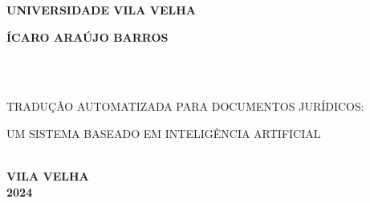 \thispagestyle{empty}

\vfill
 \begin{center}
    

    {\large\bfseries UNIVERSIDADE VILA VELHA} \\
    
   

    \vspace*{1in}
    \begin{large} \bfseries ÍCARO ARAÚJO BARROS \end{large}\\[0.4in]

    \vspace*{4cm}
    \noindent \\
    
    \large\bfseries{ 
    
    TRADUÇÃO AUTOMATIZADA PARA DOCUMENTOS JURÍDICOS:
    
    UM SISTEMA BASEADO EM INTELIGÊNCIA ARTIFICIAL} \\
    \vfill
    \large\bfseries{VILA VELHA \\2024}
\end{center}

\normalsize



